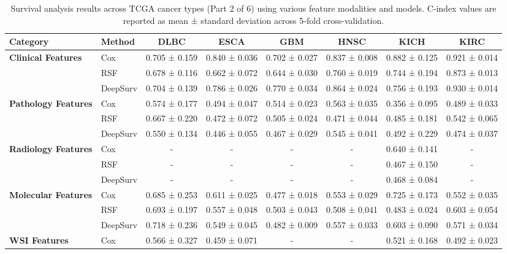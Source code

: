 \begin{sidewaystable}[htbp]
    \centering
    \caption{Survival analysis results across TCGA cancer types (Part 2 of 6) using various feature modalities and models. C-index values are reported as mean ± standard deviation across 5-fold cross-validation.}
    \label{tab:survival_results_2}
    \begin{tabular}{@{}llcccccc@{}}
        \toprule
        \textbf{Category} & \textbf{Method} & \textbf{DLBC} & \textbf{ESCA} & \textbf{GBM} & \textbf{HNSC} & \textbf{KICH} & \textbf{KIRC} \\
        \midrule
        \multirow{3}{*}{\textbf{Clinical Features}} & Cox & 0.705 ± 0.159 & 0.840 ± 0.036 & 0.702 ± 0.027 & 0.837 ± 0.008 & 0.882 ± 0.125 & 0.921 ± 0.014 \\
        & RSF & 0.678 ± 0.116 & 0.662 ± 0.072 & 0.644 ± 0.030 & 0.760 ± 0.019 & 0.744 ± 0.194 & 0.873 ± 0.013 \\
        & DeepSurv & 0.704 ± 0.139 & 0.786 ± 0.026 & 0.770 ± 0.034 & 0.864 ± 0.024 & 0.756 ± 0.193 & 0.930 ± 0.014 \\
        \midrule
        \multirow{3}{*}{\textbf{Pathology Features}} & Cox & 0.574 ± 0.177 & 0.494 ± 0.047 & 0.514 ± 0.023 & 0.563 ± 0.035 & 0.356 ± 0.095 & 0.489 ± 0.033 \\
        & RSF & 0.667 ± 0.220 & 0.472 ± 0.072 & 0.505 ± 0.024 & 0.471 ± 0.044 & 0.485 ± 0.181 & 0.542 ± 0.065 \\
        & DeepSurv & 0.550 ± 0.134 & 0.446 ± 0.055 & 0.467 ± 0.029 & 0.545 ± 0.041 & 0.492 ± 0.229 & 0.474 ± 0.037 \\
        \midrule
        \multirow{3}{*}{\textbf{Radiology Features}} & Cox & - & - & - & - & 0.640 ± 0.141 & - \\
        & RSF & - & - & - & - & 0.467 ± 0.150 & - \\
        & DeepSurv & - & - & - & - & 0.468 ± 0.084 & - \\
        \midrule
        \multirow{3}{*}{\textbf{Molecular Features}} & Cox & 0.685 ± 0.253 & 0.611 ± 0.025 & 0.477 ± 0.018 & 0.553 ± 0.029 & 0.725 ± 0.173 & 0.552 ± 0.035 \\
        & RSF & 0.693 ± 0.197 & 0.557 ± 0.048 & 0.503 ± 0.043 & 0.508 ± 0.041 & 0.483 ± 0.024 & 0.603 ± 0.054 \\
        & DeepSurv & 0.718 ± 0.236 & 0.549 ± 0.045 & 0.482 ± 0.009 & 0.557 ± 0.033 & 0.603 ± 0.090 & 0.571 ± 0.034 \\
        \midrule
        \multirow{3}{*}{\textbf{WSI Features}} & Cox & 0.566 ± 0.327 & 0.459 ± 0.071 & - & - & 0.521 ± 0.168 & 0.492 ± 0.023 \\

\end{tabular}
\end{sidewaystable}
